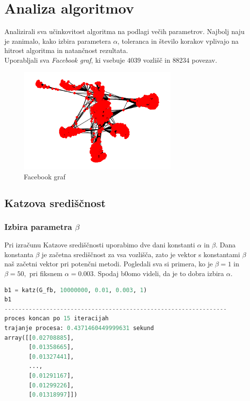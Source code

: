 \documentclass[12pt,a4paper]{amsart}
\begin{document}
\section{Analiza algoritmov}
\hspace{4.8mm}Analizirali sva učinkovitost algoritma na podlagi večih parametrov. Najbolj naju je zanimalo, kako izbira parametera $\alpha$, toleranca in število korakov vplivajo na hitrost algoritma in natančnost rezultata. \\
Uporabljali sva \textit{Facebook graf}, ki vsebuje $4039$ vozlišč in $88234$ povezav.
\begin{figure}[h]
\begin{center} 
\includegraphics[width=8cm]{Facebook_graph.png}
\caption[Facebook graf]{Facebook graf}
\end{center}
\end{figure}

\subsection{Katzova središčnost}
\subsubsection{Izbira parametra $\beta$}
Pri izračunu Katzove središčnosti uporabimo dve dani konstanti $\alpha$ in $\beta.$ Dana konstanta $\beta$ je začetna središčnost za vsa vozlišča, zato je vektor s konstantami $\beta$ naš začetni vektor pri potenčni metodi. Pogledali sva si primera, ko je $\beta =1$ in $\beta =50,$ pri fiksnem $\alpha = 0.003$. Spodaj b0omo videli, da je to dobra izbira $\alpha.$

\begin{lstlisting}[language=Python]
b1 = katz(G_fb, 10000000, 0.01, 0.003, 1)
b1
----------------------------------------------------------------
proces koncan po 15 iteracijah
trajanje procesa: 0.4371460449999631 sekund
array([[0.02708885],
       [0.01358665],
       [0.01327441],
       ...,
       [0.01291167],
       [0.01299226],
       [0.01318997]])
\end{lstlisting}
\end{document}
